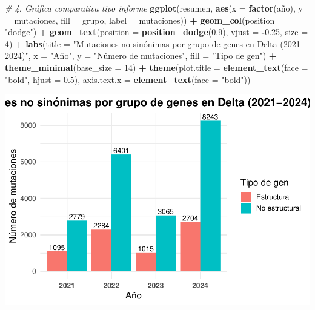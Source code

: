 \documentclass[
]{article}
\newenvironment{Shaded}{\begin{snugshade}}{\end{snugshade}}
\newcommand{\AttributeTok}[1]{\textcolor[rgb]{0.13,0.29,0.53}{#1}}
\newcommand{\CommentTok}[1]{\textcolor[rgb]{0.56,0.35,0.01}{\textit{#1}}}
\newcommand{\DecValTok}[1]{\textcolor[rgb]{0.00,0.00,0.81}{#1}}
\newcommand{\FloatTok}[1]{\textcolor[rgb]{0.00,0.00,0.81}{#1}}
\newcommand{\FunctionTok}[1]{\textcolor[rgb]{0.13,0.29,0.53}{\textbf{#1}}}
\newcommand{\NormalTok}[1]{#1}
\newcommand{\SpecialCharTok}[1]{\textcolor[rgb]{0.81,0.36,0.00}{\textbf{#1}}}
\newcommand{\StringTok}[1]{\textcolor[rgb]{0.31,0.60,0.02}{#1}}
\begin{document}
\begin{Shaded}
\begin{Highlighting}[]
\CommentTok{\# 4. Gráfica comparativa tipo informe}
\FunctionTok{ggplot}\NormalTok{(resumen, }\FunctionTok{aes}\NormalTok{(}\AttributeTok{x =} \FunctionTok{factor}\NormalTok{(año), }\AttributeTok{y =}\NormalTok{ mutaciones, }\AttributeTok{fill =}\NormalTok{ grupo, }\AttributeTok{label =}\NormalTok{ mutaciones)) }\SpecialCharTok{+}
  \FunctionTok{geom\_col}\NormalTok{(}\AttributeTok{position =} \StringTok{"dodge"}\NormalTok{) }\SpecialCharTok{+}
  \FunctionTok{geom\_text}\NormalTok{(}\AttributeTok{position =} \FunctionTok{position\_dodge}\NormalTok{(}\FloatTok{0.9}\NormalTok{), }\AttributeTok{vjust =} \SpecialCharTok{{-}}\FloatTok{0.25}\NormalTok{, }\AttributeTok{size =} \DecValTok{4}\NormalTok{) }\SpecialCharTok{+}
  \FunctionTok{labs}\NormalTok{(}\AttributeTok{title =} \StringTok{"Mutaciones no sinónimas por grupo de genes en Delta (2021–2024)"}\NormalTok{,}
       \AttributeTok{x =} \StringTok{"Año"}\NormalTok{, }\AttributeTok{y =} \StringTok{"Número de mutaciones"}\NormalTok{, }\AttributeTok{fill =} \StringTok{"Tipo de gen"}\NormalTok{) }\SpecialCharTok{+}
  \FunctionTok{theme\_minimal}\NormalTok{(}\AttributeTok{base\_size =} \DecValTok{14}\NormalTok{) }\SpecialCharTok{+}
  \FunctionTok{theme}\NormalTok{(}\AttributeTok{plot.title =} \FunctionTok{element\_text}\NormalTok{(}\AttributeTok{face =} \StringTok{"bold"}\NormalTok{, }\AttributeTok{hjust =} \FloatTok{0.5}\NormalTok{),}
        \AttributeTok{axis.text.x =} \FunctionTok{element\_text}\NormalTok{(}\AttributeTok{face =} \StringTok{"bold"}\NormalTok{))}
\end{Highlighting}
\end{Shaded}

\includegraphics{situacion_problema_files/figure-latex/unnamed-chunk-3-2.pdf}
\end{document}
